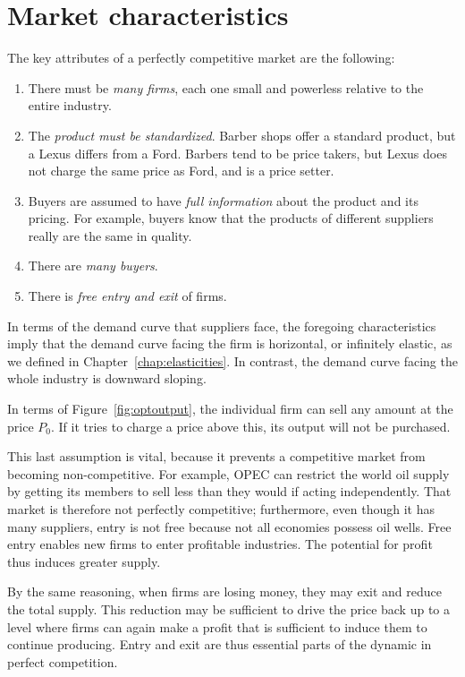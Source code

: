 \section{Market characteristics}\label{sec:ch9sec2}

The key attributes of a perfectly competitive market are the following:

\begin{enumerate}
\item  There must be \textit{many firms}, each one small and powerless relative to the entire industry.

\item  The \textit{product must be standardized}. Barber shops offer a standard product, but a Lexus differs from a Ford. Barbers tend to be price takers, but Lexus does not charge the same price as Ford, and is a price setter. 

\item  Buyers are assumed to have \textit{full information} about the product and its pricing. For example, buyers know that the products of different suppliers really are the same in quality.

\item  There are \textit{many buyers}.

\item  There is \textit{free entry and exit} of firms. 
\end{enumerate}

In terms of the demand curve that suppliers face, the foregoing characteristics imply that the demand curve facing the firm is horizontal, or infinitely elastic, as we defined in Chapter~\ref{chap:elasticities}. In contrast, the demand curve facing the whole industry is downward sloping.

In terms of Figure~\ref{fig:optoutput}, the individual firm can sell any amount at the price $P_0$. If it tries to charge a price above this, its output will not be purchased.



This last assumption is vital, because it prevents a competitive market from becoming non-competitive. For example, OPEC can restrict the world oil supply by getting its members to sell less than they would if acting independently. That market is therefore not perfectly competitive; furthermore, even though it has many suppliers, entry is not free because not all economies possess oil wells. Free entry enables new firms to enter profitable industries. The potential for profit thus induces greater supply.

By the same reasoning, when firms are losing money, they may exit and reduce the total supply. This reduction may be sufficient to drive the price back up to a level where firms can again make a profit that is sufficient to induce them to continue producing.  Entry and exit are thus essential parts of the dynamic in perfect competition.